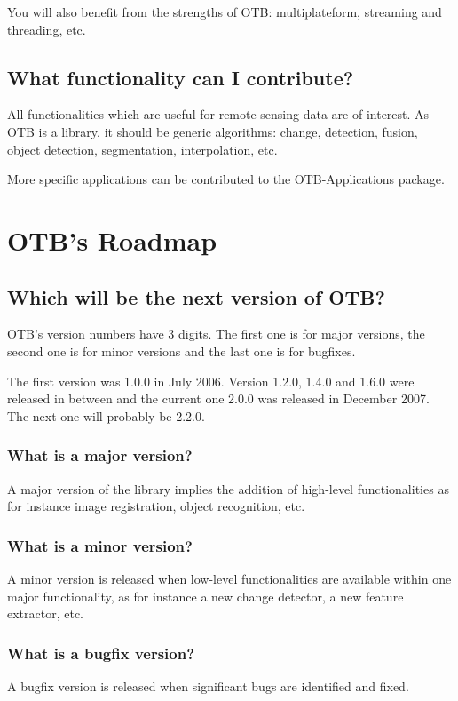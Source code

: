 You will also benefit from the strengths of OTB: multiplateform, streaming and 
threading, etc.

\subsection{What functionality can I contribute?}

All functionalities which are useful for remote sensing data are of interest. As 
OTB is a library, it should be generic algorithms: change, detection, fusion, 
object detection, segmentation, interpolation, etc.

More specific applications can be contributed to the OTB-Applications package.

\section{OTB's Roadmap}
\subsection{Which will be the next version of OTB?}
OTB's version numbers have 3 digits. The first one is for major
versions, the second one is for minor versions and the last one is for
bugfixes.

The first version was 1.0.0 in July 2006. Version 1.2.0, 1.4.0 and 1.6.0 were 
released in between and the current one 2.0.0 was released in December 2007. 
The next one will probably be 2.2.0.

\subsubsection{What is a major version?}
A major version of the library implies the addition of high-level
functionalities as for instance image registration, object recognition, etc.

\subsubsection{What is a minor version?}
A minor version is released when low-level functionalities are
available within one major functionality, as for instance a new
change detector, a new feature extractor, etc.

\subsubsection{What is a bugfix version?}
A bugfix version is released when significant bugs are identified and fixed.

